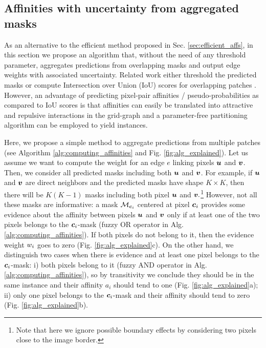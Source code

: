 \subsection{Affinities with uncertainty from aggregated masks}\label{sec:aggr_affs}
As an alternative to the efficient method proposed in Sec. \ref{sec:efficient_affs}, in this section we propose an algorithm that, without the need of any threshold parameter, aggregates predictions from overlapping \maskname masks and output edge weights with associated uncertainty.
Related work either threshold the predicted \maskname masks \cite{januszewski2018high,hirsch2020patchperpix,meirovitch2016multi} or compute Intersection over Union (IoU) scores for overlapping patches \cite{liu2016multi}. However, an advantage of predicting pixel-pair affinities / pseudo-probabilities as compared to IoU scores is that affinities can easily be translated into attractive and repulsive interactions in the grid-graph 
and a parameter-free partitioning algorithm can be employed to yield instances.

Here, we propose a simple method to aggregate predictions from multiple patches (see Algorithm \ref{alg:computing_affinities} and Fig. \ref{fig:alg_explained}). Let us assume we want to compute the weight for an edge $e$ linking pixels $\coord{u}$ and $\coord{v}$. Then, we consider all predicted \maskname masks including both $\coord{u}$ and $\coord{v}$. For example, if $\coord{u}$ and $\coord{v}$ are direct neighbors and the predicted masks have shape $K\times K$, then there will be $K(K-1)$ masks including both pixel $\coord{u}$ and $\coord{v}.$\footnote{Note that here we ignore possible boundary effects by considering two pixels close to the image border.} 
However, not all these masks are informative: a mask $\mathcal{M}_{\coord{c}_i}$ centered at pixel $\coord{c}_i$ provides some evidence about the affinity between pixels $\coord{u}$ and $\coord{v}$ only if at least one of the two pixels belongs to the $\coord{c}_i$-mask (fuzzy OR operator  in Alg. \ref{alg:computing_affinities}).
If both pixels do not belong to it, then the evidence weight $w_i$ goes to zero (Fig. \ref{fig:alg_explained}c).
On the other hand, we distinguish two cases when there is evidence and at least one pixel belongs to the $\coord{c}_i$-mask: i)
both pixels belong to it (fuzzy AND operator  in Alg. \ref{alg:computing_affinities}), so by transitivity we conclude they should be in the same instance and their affinity $a_i$ should tend to one (Fig. \ref{fig:alg_explained}a); 
ii) only one pixel belongs to the $\coord{c}_i$-mask and their affinity should tend to zero (Fig. \ref{fig:alg_explained}b). 

